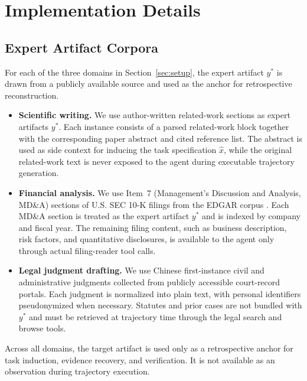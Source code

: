\newpage
\appendix

\section{Implementation Details}
\label{app:impl}

\subsection{Expert Artifact Corpora}
\label{app:corpora}

For each of the three domains in Section~\ref{sec:setup}, the expert
artifact $y^\ast$ is drawn from a publicly available source and used as
the anchor for retrospective reconstruction.

\begin{itemize}[leftmargin=*]
  \item \textbf{Scientific writing.}
    We use author-written related-work sections as expert artifacts
    $y^\ast$. Each instance consists of a parsed related-work block
    together with the corresponding paper abstract and cited reference
    list. The abstract is used as side context for inducing the task
    specification $\hat{x}$, while the original related-work text is
    never exposed to the agent during executable trajectory generation.

  \item \textbf{Financial analysis.}
    We use Item~7 (Management's Discussion and Analysis, MD\&A)
    sections of U.S. SEC 10-K filings from the EDGAR corpus
    \citep{loukas2021edgar}. Each MD\&A section is treated as the
    expert artifact $y^\ast$ and is indexed by company and fiscal year.
    The remaining filing content, such as business description, risk
    factors, and quantitative disclosures, is available to the agent
    only through actual filing-reader tool calls.

  \item \textbf{Legal judgment drafting.}
    We use Chinese first-instance civil and administrative judgments
    collected from publicly accessible court-record portals. Each
    judgment is normalized into plain text, with personal identifiers
    pseudonymized when necessary. Statutes and prior cases are not
    bundled with $y^\ast$ and must be retrieved at trajectory time
    through the legal search and browse tools.
\end{itemize}

Across all domains, the target artifact is used only as a retrospective
anchor for task induction, evidence recovery, and verification. It is not
available as an observation during trajectory execution.

